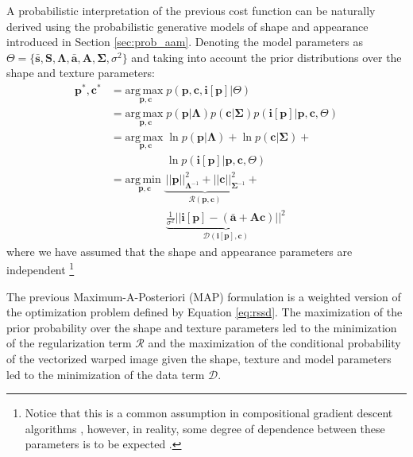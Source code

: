 A probabilistic interpretation of the previous cost function can be naturally derived using the probabilistic generative models of shape and appearance introduced in Section \ref{sec:prob_aam}. Denoting the model parameters as \mbox{$\Theta = \{\mathbf{\bar{s}}, \mathbf{S}, \mathbf{\Lambda}, \mathbf{\bar{a}}, \mathbf{A}, \mathbf{\Sigma}, \sigma^2\}$} and taking into account the prior distributions over the shape and texture parameters:
\begin{equation}
    \begin{aligned}
        \mathbf{p}^*, \mathbf{c}^* & = \underset{\mathbf{p}, \mathbf{c}}{\mathrm{arg\,max\;}} p(\mathbf{p}, \mathbf{c}, \mathbf{i}[\mathbf{p}] | \Theta) 
        \\
        & = \underset{\mathbf{p}, \mathbf{c}}{\mathrm{arg\,max\;}}  p(\mathbf{p} | \mathbf{\Lambda})  p(\mathbf{c} | \mathbf{\Sigma}) p(\mathbf{i}[\mathbf{p}] |
        \mathbf{p}, \mathbf{c}, \Theta)  
        \\
        & = \underset{\mathbf{p}, \mathbf{c}}{\mathrm{arg\,max\;}}  \ln p(\mathbf{p} | \mathbf{\Lambda}) + \ln p(\mathbf{c} | \mathbf{\Sigma}) +
        \\
        & \qquad \qquad \quad \ln p(\mathbf{i}[\mathbf{p}] | \mathbf{p}, \mathbf{c}, \Theta)
        \\
        & = \underset{\mathbf{p}, \mathbf{c}}{\mathrm{arg\,min\;}}  \underbrace{\frac{}{} ||\mathbf{p}||^2_{\mathbf{\Lambda}^{-1}} + ||\mathbf{c}||^2_{\mathbf{\Sigma}^{-1}}}_{\mathcal{R}(\mathbf{p}, \mathbf{c})} +
        \\
        & \qquad \qquad \quad  \underbrace{ \frac{1}{\sigma^2} || \mathbf{i}[\mathbf{p}] - (\mathbf{\bar{a}} + \mathbf{A} \mathbf{c}) ||^2}_{\mathcal{D}(\mathbf{i}[\mathbf{p}], \mathbf{c})} 
    \end{aligned}
    \label{eq:prob_rssd}
\end{equation}
where we have assumed that the shape and appearance parameters are independent \footnote{Notice that this is a common assumption in compositional gradient descent algorithms \cite{Matthews2004}, however, in reality, some degree of dependence between these parameters is to be expected \cite{Cootes2001}.}

The previous Maximum-A-Posteriori (MAP) formulation is a weighted version of the optimization problem defined by Equation \ref{eq:rssd}. The maximization of the prior probability over the shape and texture parameters led to the minimization of the regularization term $\mathcal{R}$ and the maximization of the conditional probability of the vectorized warped image given the shape, texture and model parameters led to the minimization of the data term $\mathcal{D}$.

